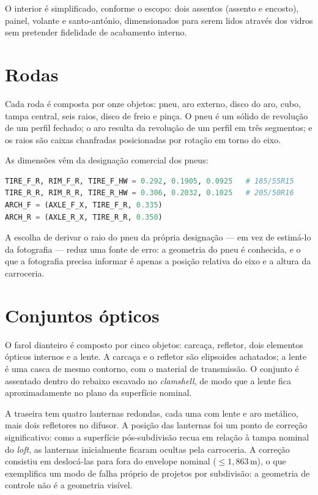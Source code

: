 O interior \'e simplificado, conforme o escopo: dois assentos (assento e encosto), painel,
volante e santo-ant\'onio, dimensionados para serem lidos atrav\'es dos vidros sem pretender
fidelidade de acabamento interno.

\section{Rodas}\label{sec:rodas}

Cada roda \'e composta por onze objetos: pneu, aro externo, disco do aro, cubo, tampa central,
seis raios, disco de freio e pin{\c{c}}a. O pneu \'e um s\'olido de revolu{\c{c}}\~ao de um perfil
fechado; o aro resulta da revolu{\c{c}}\~ao de um perfil em tr\^es segmentos; e os raios s\~ao
caixas chanfradas posicionadas por rota{\c{c}}\~ao em torno do eixo.

As dimens\~oes v\^em da designa{\c{c}}\~ao comercial dos pneus:

\begin{lstlisting}[language=Python]
TIRE_F_R, RIM_F_R, TIRE_F_HW = 0.292, 0.1905, 0.0925   # 185/55R15
TIRE_R_R, RIM_R_R, TIRE_R_HW = 0.306, 0.2032, 0.1025   # 205/50R16
ARCH_F = (AXLE_F_X, TIRE_F_R, 0.335)
ARCH_R = (AXLE_R_X, TIRE_R_R, 0.350)
\end{lstlisting}

A escolha de derivar o raio do pneu da pr\'opria designa{\c{c}}\~ao --- em vez de estim\'a-lo
da fotografia --- reduz uma fonte de erro: a geometria do pneu \'e conhecida, e o que a
fotografia precisa informar \'e apenas a posi{\c{c}}\~ao relativa do eixo e a altura da
carroceria.

\section{Conjuntos \'opticos}\label{sec:optica}

O farol dianteiro \'e composto por cinco objetos: carca{\c{c}}a, refletor, dois elementos
\'opticos internos e a lente. A carca{\c{c}}a e o refletor s\~ao elipsoides achatados; a lente
\'e uma casca de mesmo contorno, com o material de transmiss\~ao. O conjunto é
assentado dentro do rebaixo escavado no \emph{clamshell}, de modo que a lente fica
aproximadamente no plano da superf\'icie nominal.

A traseira tem quatro lanternas redondas, cada uma com lente e aro met\'alico, mais dois
refletores no difusor. A posi{\c{c}}\~ao das lanternas foi um ponto de corre{\c{c}}\~ao
significativo: como a superf\'icie p\'os-subdivis\~ao recua em rela{\c{c}}\~ao \`a tampa
nominal do \emph{loft}, as lanternas inicialmente ficaram ocultas pela carroceria. A
corre{\c{c}}\~ao consistiu em desloc\'a-las para fora do envelope nominal
($\leq 1,863$\,m), o que exemplifica um modo de falha pr\'oprio de projetos por
subdivis\~ao: a geometria de controle n\~ao \'e a geometria vis\'ivel.

